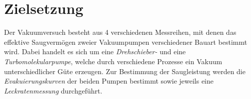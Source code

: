 \section{Zielsetzung}
\label{sec:zielsetzung}
Der Vakuumversuch besteht aus 4 verschiedenen Messreihen,
mit denen das effektive Saugvermögen zweier Vakuumpumpen
verschiedener Bauart bestimmt wird. 
Dabei handelt es sich um eine \textit{Drehschieber-}
und eine \textit{Turbomolekularpumpe},
welche durch verschiedene Prozesse ein Vakuum unterschiedlicher Güte erzeugen. 
Zur Bestimmung der Saugleistung werden die \textit{Evakuierungskurven} der beiden Pumpen bestimmt
sowie jeweils eine \textit{Leckratenmessung} durchgeführt. 